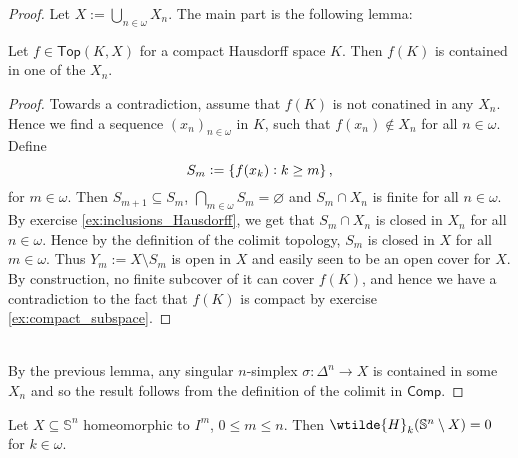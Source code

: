 \begin{proof}
	Let $X := \bigcup_{n \in \omega} X_n$. The main part is the following lemma:

	\begin{lemma}
		Let $f \in \mathsf{Top}(K,X)$ for a compact Hausdorff space $K$. Then $f(K)$ is contained in one of the $X_n$.	
	\end{lemma}

	\begin{proof}
		Towards a contradiction, assume that $f(K)$ is not conatined in any $X_n$. Hence we find a sequence $(x_n)_{n \in \omega}$ in $K$, such that $f(x_n) \notin X_n$ for all $n \in \omega$. Define
		\begin{equation*}
			S_m := \cbr[0]{f(x_k) : k \geq m},
		\end{equation*}
		\noindent for $m \in \omega$. Then $S_{m + 1} \subseteq S_m$, $\bigcap_{m \in \omega} S_m = \varnothing$ and $S_m \cap X_n$ is finite for all $n \in \omega$. By exercise \ref{ex:inclusions_Hausdorff}, we get that $S_m \cap X_n$ is closed in $X_n$ for all $n \in \omega$. Hence by the definition of the colimit topology, $S_m$ is closed in $X$ for all $m \in \omega$. Thus $Y_m := X \setminus S_m$ is open in $X$ and easily seen to be an open cover for $X$. By construction, no finite subcover of it can cover $f(K)$, and hence we have a contradiction to the fact that $f(K)$ is compact by exercise \ref{ex:compact_subspace}.
	\end{proof}\\
	By the previous lemma, any singular $n$-simplex $\sigma : \Delta^n \to X$ is contained in some $X_n$ and so the result follows from the definition of the colimit in $\mathsf{Comp}$.
\end{proof}

\begin{proposition}
	Let $X \subseteq \mathbb{S}^n$ homeomorphic to $I^m$, $0 \leq m \leq n$. Then $\wtilde{H}_k(\mathbb{S}^n \setminus X) = 0$ for $k \in \omega$.
\end{proposition}

